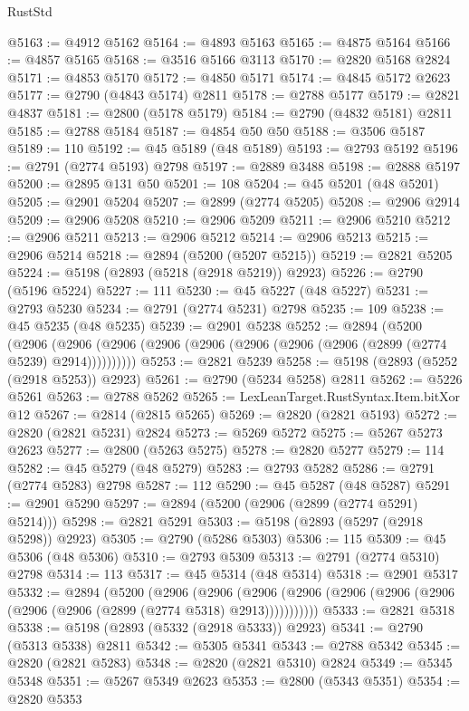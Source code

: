 \begin{lexlean}{RustStd}
\begin{coremodule}
@5163 := @4912 @5162
@5164 := @4893 @5163
@5165 := @4875 @5164
@5166 := @4857 @5165
@5168 := @3516 @5166 @3113
@5170 := @2820 @5168 @2824
@5171 := @4853 @5170
@5172 := @4850 @5171
@5174 := @4845 @5172 @2623
@5177 := @2790 (@4843 @5174) @2811
@5178 := @2788 @5177
@5179 := @2821 @4837
@5181 := @2800 (@5178 @5179)
@5184 := @2790 (@4832 @5181) @2811
@5185 := @2788 @5184
@5187 := @4854 @50 @50
@5188 := @3506 @5187
@5189 := 110
@5192 := @45 @5189 (@48 @5189)
@5193 := @2793 @5192
@5196 := @2791 (@2774 @5193) @2798
@5197 := @2889 @3488
@5198 := @2888 @5197
@5200 := @2895 @131 @50
@5201 := 108
@5204 := @45 @5201 (@48 @5201)
@5205 := @2901 @5204
@5207 := @2899 (@2774 @5205)
@5208 := @2906 @2914
@5209 := @2906 @5208
@5210 := @2906 @5209
@5211 := @2906 @5210
@5212 := @2906 @5211
@5213 := @2906 @5212
@5214 := @2906 @5213
@5215 := @2906 @5214
@5218 := @2894 (@5200 (@5207 @5215))
@5219 := @2821 @5205
@5224 := @5198 (@2893 (@5218 (@2918 @5219)) @2923)
@5226 := @2790 (@5196 @5224)
@5227 := 111
@5230 := @45 @5227 (@48 @5227)
@5231 := @2793 @5230
@5234 := @2791 (@2774 @5231) @2798
@5235 := 109
@5238 := @45 @5235 (@48 @5235)
@5239 := @2901 @5238
@5252 := @2894
    (@5200
      (@2906 (@2906 (@2906 (@2906 (@2906 (@2906 (@2906 (@2906 (@2899 (@2774 @5239) @2914))))))))))
@5253 := @2821 @5239
@5258 := @5198 (@2893 (@5252 (@2918 @5253)) @2923)
@5261 := @2790 (@5234 @5258) @2811
@5262 := @5226 @5261
@5263 := @2788 @5262
@5265 := LexLeanTarget.RustSyntax.Item.bitXor @12
@5267 := @2814 (@2815 @5265)
@5269 := @2820 (@2821 @5193)
@5272 := @2820 (@2821 @5231) @2824
@5273 := @5269 @5272
@5275 := @5267 @5273 @2623
@5277 := @2800 (@5263 @5275)
@5278 := @2820 @5277
@5279 := 114
@5282 := @45 @5279 (@48 @5279)
@5283 := @2793 @5282
@5286 := @2791 (@2774 @5283) @2798
@5287 := 112
@5290 := @45 @5287 (@48 @5287)
@5291 := @2901 @5290
@5297 := @2894 (@5200 (@2906 (@2899 (@2774 @5291) @5214)))
@5298 := @2821 @5291
@5303 := @5198 (@2893 (@5297 (@2918 @5298)) @2923)
@5305 := @2790 (@5286 @5303)
@5306 := 115
@5309 := @45 @5306 (@48 @5306)
@5310 := @2793 @5309
@5313 := @2791 (@2774 @5310) @2798
@5314 := 113
@5317 := @45 @5314 (@48 @5314)
@5318 := @2901 @5317
@5332 := @2894
    (@5200
      (@2906
        (@2906
          (@2906 (@2906 (@2906 (@2906 (@2906 (@2906 (@2906 (@2899 (@2774 @5318) @2913)))))))))))
@5333 := @2821 @5318
@5338 := @5198 (@2893 (@5332 (@2918 @5333)) @2923)
@5341 := @2790 (@5313 @5338) @2811
@5342 := @5305 @5341
@5343 := @2788 @5342
@5345 := @2820 (@2821 @5283)
@5348 := @2820 (@2821 @5310) @2824
@5349 := @5345 @5348
@5351 := @5267 @5349 @2623
@5353 := @2800 (@5343 @5351)
@5354 := @2820 @5353

\end{coremodule}
\end{lexlean}
